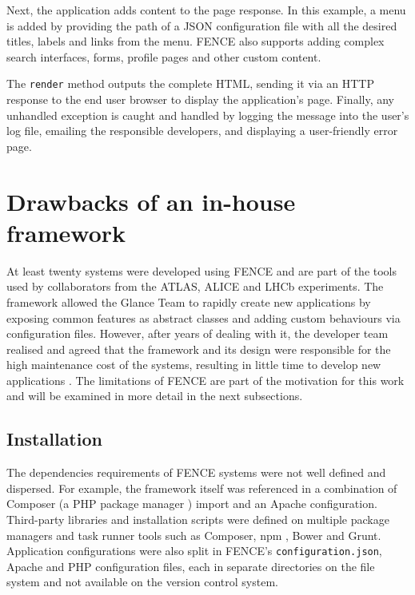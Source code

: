 Next, the application adds content to the page response. In this example, a menu is added by providing the path of a JSON configuration file with all the desired titles, labels and links from the menu. FENCE also supports adding complex search interfaces, forms, profile pages and other custom content.

The \texttt{render} method outputs the complete HTML, sending it via an \acrshort{HTTP} response to the end user browser to display the application's page. Finally, any unhandled exception is caught and handled by logging the message into the user's log file, emailing the responsible developers, and displaying a user-friendly error page.

\section{Drawbacks of an in-house framework}

At least twenty systems were developed using FENCE \cite{pinhao-tcc} and are part of the tools used by collaborators from the ATLAS, ALICE and LHCb experiments. The framework allowed the Glance Team to rapidly create new applications by exposing common features as abstract classes and adding custom behaviours via configuration files. However, after years of dealing with it, the developer team realised and agreed that the framework and its design were responsible for the high maintenance cost of the systems, resulting in little time to develop new applications \cite{de-jesus-tcc}. The limitations of FENCE are part of the motivation for this work and will be examined in more detail in the next subsections.

\subsection{Installation}

The dependencies requirements of FENCE systems were not well defined and dispersed. For example, the framework itself was referenced in a combination of Composer (a PHP package manager \cite{composer-website}) import and an Apache configuration. Third-party libraries and installation scripts were defined on multiple package managers and task runner tools such as Composer, npm \cite{npm-website}, Bower \cite{bower-website} and Grunt\cite{grunt-website}. Application configurations were also split in FENCE's \texttt{configuration.json}, Apache and PHP configuration files, each in separate directories on the file system and not available on the version control system.

